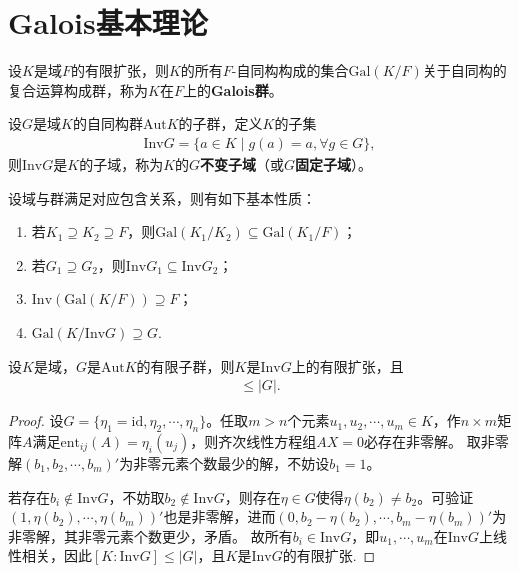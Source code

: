 \documentclass[../../main.tex]{subfiles}%
\begin{document}
\section{Galois基本理论}

\begin{definition}
设$K$是域$F$的有限扩张，则$K$的所有$F$-自同构构成的集合$\mathrm{Gal}(K/F)$关于自同构的复合运算构成群，称为$K$在$F$上的\textbf{Galois群}。
\end{definition}

\begin{definition}
设$G$是域$K$的自同构群$\mathrm{Aut}K$的子群，定义$K$的子集
\begin{align*}
\mathrm{Inv}G=\{a\in K\mid g(a)=a,\forall g\in G\},
\end{align*}
则$\mathrm{Inv}G$是$K$的子域，称为$K$的$G$\textbf{不变子域}（或$G$\textbf{固定子域}）。
\end{definition}

\begin{proposition}
设域与群满足对应包含关系，则有如下基本性质：
\begin{enumerate}[(1)]
\item 若$K_1\supseteq K_2\supseteq F$，则$\mathrm{Gal}(K_1/K_2)\subseteq\mathrm{Gal}(K_1/F)$；
\item 若$G_1\supseteq G_2$，则$\mathrm{Inv}G_1\subseteq\mathrm{Inv}G_2$；
\item $\mathrm{Inv}(\mathrm{Gal}(K/F))\supseteq F$；
\item $\mathrm{Gal}(K/\mathrm{Inv}G)\supseteq G$.
\end{enumerate}
\end{proposition}

\begin{theorem}
设$K$是域，$G$是$\mathrm{Aut}K$的有限子群，则$K$是$\mathrm{Inv}G$上的有限扩张，且
\begin{align*}
[K:\mathrm{Inv}G]\leqslant|G|.
\end{align*}
\end{theorem}

\begin{proof}
设$G=\{\eta_1=\mathrm{id},\eta_2,\cdots,\eta_n\}$。任取$m>n$个元素$u_1,u_2,\cdots,u_m\in K$，作$n\times m$矩阵$A$满足$\mathrm{ent}_{ij}(A)=\eta_i(u_j)$，则齐次线性方程组$AX=0$必存在非零解。
取非零解$(b_1,b_2,\cdots,b_m)'$为非零元素个数最少的解，不妨设$b_1=1$。

若存在$b_i\notin\mathrm{Inv}G$，不妨取$b_2\notin\mathrm{Inv}G$，则存在$\eta\in G$使得$\eta(b_2)\neq b_2$。可验证$(1,\eta(b_2),\cdots,\eta(b_m))'$也是非零解，进而$(0,b_2-\eta(b_2),\cdots,b_m-\eta(b_m))'$为非零解，其非零元素个数更少，矛盾。
故所有$b_i\in\mathrm{Inv}G$，即$u_1,\cdots,u_m$在$\mathrm{Inv}G$上线性相关，因此$[K:\mathrm{Inv}G]\leqslant|G|$，且$K$是$\mathrm{Inv}G$的有限扩张.
\end{proof}
\end{document}

